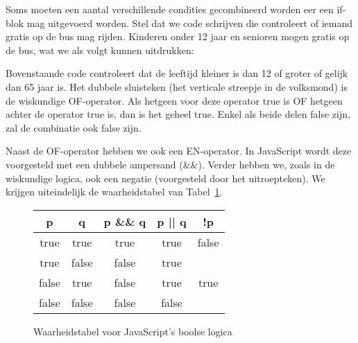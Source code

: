 Soms moeten een aantal verschillende condities gecombineerd worden eer een if-blok mag uitgevoerd worden. Stel dat we code schrijven die controleert of iemand gratis op de bus mag rijden. Kinderen onder 12 jaar en senioren mogen gratis op de bus, wat we als volgt kunnen uitdrukken:


Bovenstaande code controleert dat de leeftijd kleiner is dan 12 of groter of gelijk dan 65 jaar is. Het dubbele sluisteken (het verticale streepje in de volksmond) is de wiskundige OF-operator. Als hetgeen voor deze operator true is OF hetgeen achter de operator true is, dan is het geheel true. Enkel als beide delen false zijn, zal de combinatie ook false zijn.

Naast de OF-operator hebben we ook een EN-operator. In JavaScript wordt deze voorgesteld met een dubbele ampersand (\&\&). Verder hebben we, zoals in de wiskundige logica, ook een negatie (voorgesteld door het uitroepteken). We krijgen uiteindelijk de waarheidstabel van Tabel~\ref{tab:truthtable}.

\begin{figure}
\begin{center}
\begin{tabular}{|c|c|c|c|c|}
\hline
\textbf{p} & \textbf{q} & \textbf{p \&\& q} & \textbf{p || q} & \textbf{!p} \\
\hline
true & true & true & true & false \\
\hline
true & false & false & true &  \\
\hline
false & true & false & true & true \\
\hline
false & false & false & false &  \\
\hline
\end{tabular}
\end{center}
\caption{Waarheidstabel voor JavaScript's boolse logica}\label{tab:truthtable}
\end{figure}

